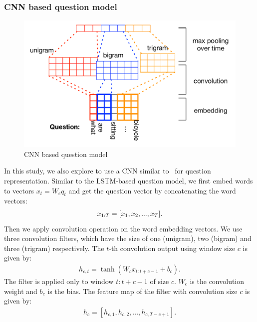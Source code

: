 \documentclass[10pt,twocolumn,letterpaper]{article}
\begin{document}
\subsubsection{CNN based question model}
\label{sec:question_cnn}
\begin{figure}[tbh]
  \vspace{-0.3cm}
  \includegraphics[width=1.1\linewidth]{cnn_att.pdf}
  \centering
  \caption{CNN based question model}
  \label{fig:cnn}
  \vspace{-0.3cm}
\end{figure}

In this study, we also explore to use a CNN similar
to~\cite{kim2014convolutional} for question representation. Similar to the
LSTM-based question model, we first embed words to vectors $x_{t} = W_{e}q_{t}$
and get the question vector by concatenating the word vectors:
\begin{align}
  \vspace{-0.5cm}
  x_{1:T} = [x_{1}, x_{2}, ..., x_{T}].
  \vspace{-0.5cm}
\end{align}
Then we apply convolution operation on the word embedding vectors. We use three
convolution filters, which have the size of one (unigram), two (bigram) and
three (trigram) respectively. The $t$-th convolution output using window size
$c$ is given by:
\begin{align}
  h_{c,t} = \tanh(W_{c}x_{t:t+c-1} + b_{c}).
\end{align}
The filter is applied only to window $t:t+c-1$ of size $c$. $W_{c}$ is the
convolution weight and $b_{c}$ is the bias. The feature map of the filter with
convolution size $c$ is given by:
\begin{align}
  h_{c} = [h_{c,1}, h_{c,2}, ..., h_{c,T-c+1}].
\end{align}
\end{document}
